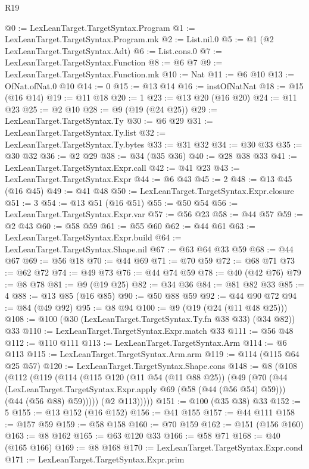 \begin{lexlean}{R19}
\begin{coremodule}
@0 := LexLeanTarget.TargetSyntax.Program
@1 := LexLeanTarget.TargetSyntax.Program.mk
@2 := List.nil.{0}
@5 := @1 (@2 LexLeanTarget.TargetSyntax.Adt)
@6 := List.cons.{0}
@7 := LexLeanTarget.TargetSyntax.Function
@8 := @6 @7
@9 := LexLeanTarget.TargetSyntax.Function.mk
@10 := Nat
@11 := @6 @10
@13 := OfNat.ofNat.{0} @10
@14 := 0
@15 := @13 @14
@16 := instOfNatNat
@18 := @15 (@16 @14)
@19 := @11 @18
@20 := 1
@23 := @13 @20 (@16 @20)
@24 := @11 @23
@25 := @2 @10
@28 := @9 (@19 (@24 @25))
@29 := LexLeanTarget.TargetSyntax.Ty
@30 := @6 @29
@31 := LexLeanTarget.TargetSyntax.Ty.list
@32 := LexLeanTarget.TargetSyntax.Ty.bytes
@33 := @31 @32
@34 := @30 @33
@35 := @30 @32
@36 := @2 @29
@38 := @34 (@35 @36)
@40 := @28 @38 @33
@41 := LexLeanTarget.TargetSyntax.Expr.call
@42 := @41 @23
@43 := LexLeanTarget.TargetSyntax.Expr
@44 := @6 @43
@45 := 2
@48 := @13 @45 (@16 @45)
@49 := @41 @48
@50 := LexLeanTarget.TargetSyntax.Expr.closure
@51 := 3
@54 := @13 @51 (@16 @51)
@55 := @50 @54
@56 := LexLeanTarget.TargetSyntax.Expr.var
@57 := @56 @23
@58 := @44 @57
@59 := @2 @43
@60 := @58 @59
@61 := @55 @60
@62 := @44 @61
@63 := LexLeanTarget.TargetSyntax.Expr.build
@64 := LexLeanTarget.TargetSyntax.Shape.nil
@67 := @63 @64 @33 @59
@68 := @44 @67
@69 := @56 @18
@70 := @44 @69
@71 := @70 @59
@72 := @68 @71
@73 := @62 @72
@74 := @49 @73
@76 := @44 @74 @59
@78 := @40 (@42 @76)
@79 := @8 @78
@81 := @9 (@19 @25)
@82 := @34 @36
@84 := @81 @82 @33
@85 := 4
@88 := @13 @85 (@16 @85)
@90 := @50 @88 @59
@92 := @44 @90 @72
@94 := @84 (@49 @92)
@95 := @8 @94
@100 := @9 (@19 (@24 (@11 @48 @25)))
@108 := @100 (@30 (LexLeanTarget.TargetSyntax.Ty.fn @38 @33) (@34 @82)) @33
@110 := LexLeanTarget.TargetSyntax.Expr.match @33
@111 := @56 @48
@112 := @110 @111
@113 := LexLeanTarget.TargetSyntax.Arm
@114 := @6 @113
@115 := LexLeanTarget.TargetSyntax.Arm.arm
@119 := @114 (@115 @64 @25 @57)
@120 := LexLeanTarget.TargetSyntax.Shape.cons
@148 := @8
    (@108
      (@112
        (@119
          (@114
            (@115
              @120
              (@11 @54 (@11 @88 @25))
              (@49
                (@70
                  (@44
                    (LexLeanTarget.TargetSyntax.Expr.apply @69 (@58 (@44 (@56 @54) @59)))
                    (@44 (@56 @88) @59)))))
            (@2 @113)))))
@151 := @100 (@35 @38) @33
@152 := 5
@155 := @13 @152 (@16 @152)
@156 := @41 @155
@157 := @44 @111
@158 := @157 @59
@159 := @58 @158
@160 := @70 @159
@162 := @151 (@156 @160)
@163 := @8 @162
@165 := @63 @120 @33
@166 := @58 @71
@168 := @40 (@165 @166)
@169 := @8 @168
@170 := LexLeanTarget.TargetSyntax.Expr.cond
@171 := LexLeanTarget.TargetSyntax.Expr.prim

\end{coremodule}
\end{lexlean}
